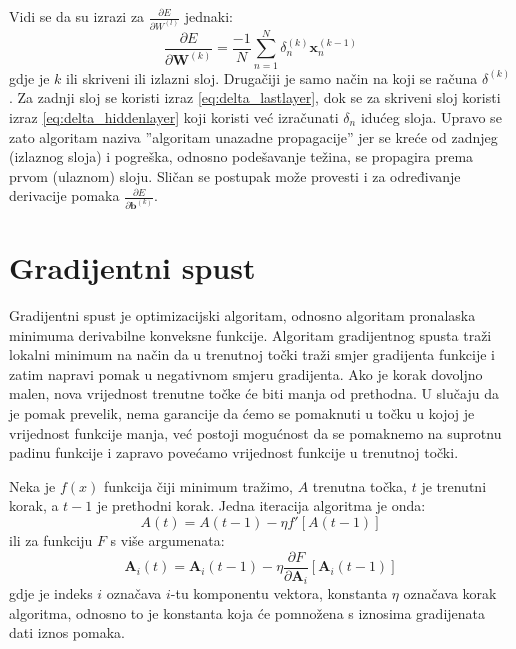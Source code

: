 \documentclass[times, utf8, diplomski, numeric]{fer}
\begin{document}
Vidi se da su izrazi za $\frac{\partial E}{\partial W^{(l)}}$ jednaki:
\begin{equation}
  \frac{\partial E}{\partial \boldsymbol{W}^{(k)}}
    = \frac{-1}{N} \sum_{n=1}^{N} \delta_n^{(k)} \boldsymbol{x}_n^{(k-1)}
\end{equation}
gdje je $k$ ili skriveni ili izlazni sloj. Drugačiji je samo način na koji se računa $\delta^{(k)}$. Za zadnji sloj se koristi izraz \ref{eq:delta_lastlayer}, dok se za skriveni sloj koristi izraz \ref{eq:delta_hiddenlayer} koji koristi već izračunati $\delta_n$ idućeg sloja. Upravo se zato algoritam naziva ''algoritam unazadne propagacije'' jer se kreće od zadnjeg (izlaznog sloja) i pogreška, odnosno podešavanje težina, se propagira prema prvom (ulaznom) sloju.
Sličan se postupak može provesti i za određivanje derivacije pomaka $\frac{\partial E}{\partial \boldsymbol{b}^{(k)}}$.

\section{Gradijentni spust}

Gradijentni spust je optimizacijski algoritam, odnosno algoritam pronalaska minimuma derivabilne konveksne funkcije. Algoritam gradijentnog spusta traži lokalni minimum na način da u trenutnoj točki traži smjer gradijenta funkcije i zatim napravi pomak u negativnom smjeru gradijenta. Ako je korak dovoljno malen, nova vrijednost trenutne točke će biti manja od prethodna.
U slučaju da je pomak prevelik, nema garancije da ćemo se pomaknuti u točku u kojoj je vrijednost funkcije manja, već postoji mogućnost da se pomaknemo na suprotnu padinu funkcije i zapravo povećamo vrijednost funkcije u trenutnoj točki.

Neka je $f(x)$ funkcija čiji minimum tražimo, $A$ trenutna točka, $t$ je trenutni korak, a $t-1$ je prethodni korak. Jedna iteracija algoritma je onda:
\begin{equation}
  A(t) = A(t-1) - \eta f' \left[ A(t-1) \right]
\end{equation}
ili za funkciju $F$ s više argumenata:
\begin{equation}
  \boldsymbol{A}_i(t) = \boldsymbol{A}_i(t-1) - \eta \frac{\partial F}{\partial \boldsymbol{A}_i} \left[ \boldsymbol{A}_i(t-1) \right]
\end{equation}
gdje je indeks $i$ označava $i$-tu komponentu vektora, konstanta $\eta$  označava korak algoritma, odnosno to je konstanta koja će pomnožena s iznosima gradijenata dati iznos pomaka.
\end{document}
